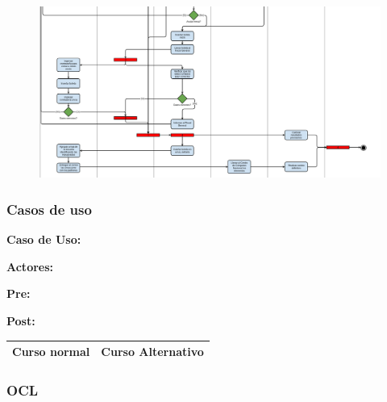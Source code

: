 \begin{figure}[h!]
\centering
\includegraphics[scale=0.5]{imagenes/actividad/actividadConteo2}
\end{figure}


\begin{figure}[H]
\centering
\end{figure}

\subsubsection{Casos de uso}


\textbf{Caso de Uso: }

\textbf{Actores:} 

\textbf{Pre:} 

\textbf{Post:}
\begin{table}[h!]
	
 \begin{tabular}{|p{7.5cm} | p{7.5cm}|} 
 \hline
 \textbf{Curso normal} & \textbf{Curso Alternativo} \\
 \hline

 \end{tabular}

\end{table}


\subsubsection{OCL}